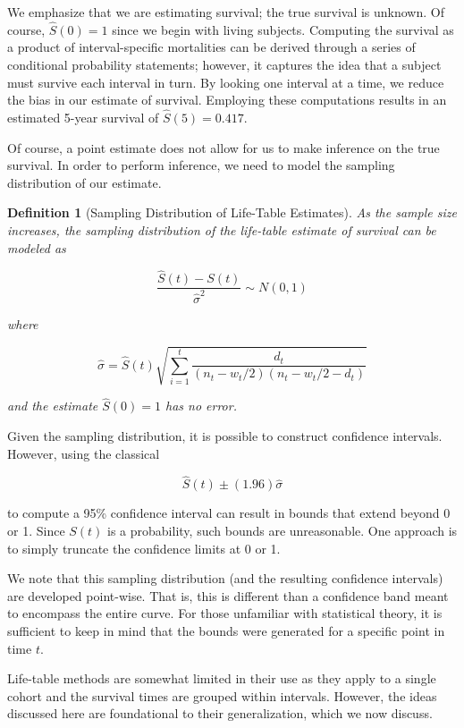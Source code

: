 \documentclass[
]{book}
\theoremstyle{plain}
\theoremstyle{mydefn}
\newtheorem{definition}{Definition}[chapter]
\theoremstyle{myexmpl}
\theoremstyle{remark}
\begin{document}
We emphasize that we are estimating survival; the true survival is unknown. Of course, \(\widehat{S}(0) = 1\) since we begin with living subjects. Computing the survival as a product of interval-specific mortalities can be derived through a series of conditional probability statements; however, it captures the idea that a subject must survive each interval in turn. By looking one interval at a time, we reduce the bias in our estimate of survival. Employing these computations results in an estimated 5-year survival of \(\widehat{S}(5) = 0.417.\)

Of course, a point estimate does not allow for us to make inference on the true survival. In order to perform inference, we need to model the sampling distribution of our estimate.

\begin{definition}[Sampling Distribution of Life-Table Estimates]
\protect\hypertarget{def:defn-samp-distn-lifetable}{}{\label{def:defn-samp-distn-lifetable} {} }As the sample size increases, the sampling distribution of the life-table estimate of survival can be modeled as

\[\frac{\widehat{S}(t) - S(t)}{\widehat{\sigma}^2} \sim N(0, 1)\]

where

\[\widehat{\sigma} = \widehat{S}(t) \sqrt{\sum\limits_{i=1}^t \frac{d_t}{\left(n_{t} - w_t/2\right)\left(n_{t} - w_t/2 - d_t\right)}}\]

and the estimate \(\widehat{S}(0) = 1\) has no error.
\end{definition}

Given the sampling distribution, it is possible to construct confidence intervals. However, using the classical

\[\widehat{S}(t) \pm (1.96) \widehat{\sigma}\]

to compute a 95\% confidence interval can result in bounds that extend beyond 0 or 1. Since \(S(t)\) is a probability, such bounds are unreasonable. One approach is to simply truncate the confidence limits at 0 or 1.

We note that this sampling distribution (and the resulting confidence intervals) are developed point-wise. That is, this is different than a confidence band meant to encompass the entire curve. For those unfamiliar with statistical theory, it is sufficient to keep in mind that the bounds were generated for a specific point in time \(t\).

Life-table methods are somewhat limited in their use as they apply to a single cohort and the survival times are grouped within intervals. However, the ideas discussed here are foundational to their generalization, which we now discuss.
\end{document}
